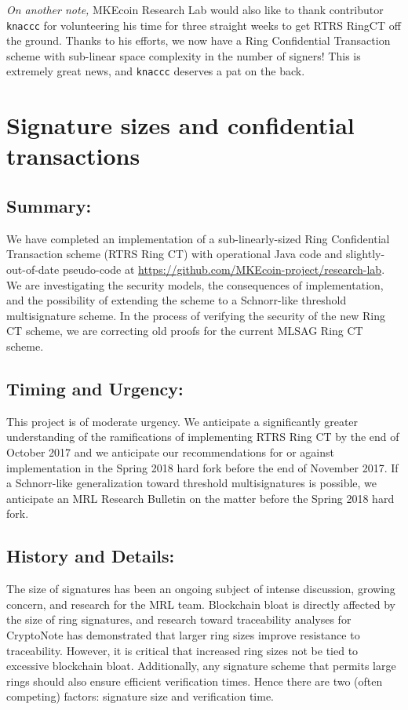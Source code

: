 \documentclass[12pt,english]{mrl}
\theoremstyle{definition}
\numberwithin{equation}{section}
\numberwithin{figure}{section}
\numberwithin{equation}{section}
\numberwithin{equation}{section}
\numberwithin{figure}{section}
\begin{document}
\textit{On another note,} MKEcoin Research Lab would also like to thank contributor \texttt{knaccc} for volunteering his time for three straight weeks to get RTRS RingCT off the ground. Thanks to his efforts, we now have a Ring Confidential Transaction scheme with sub-linear space complexity in the number of signers! This is extremely great news, and \texttt{knaccc} deserves a pat on the back.


\vspace{0.1in}

\section{Signature sizes and confidential transactions} \label{secOne}

\subsection{Summary:} 

We have completed an implementation of a sub-linearly-sized Ring Confidential Transaction scheme (RTRS Ring CT) with operational Java code and slightly-out-of-date pseudo-code at \url{https://github.com/MKEcoin-project/research-lab}. We are investigating the security models, the consequences of implementation, and the possibility of extending the scheme to a Schnorr-like threshold multisignature scheme. In the process of verifying the security of the new Ring CT scheme, we are correcting old proofs for the current MLSAG Ring CT scheme.

\subsection{Timing and Urgency:} 

This project is of moderate urgency. We anticipate a significantly greater understanding of the ramifications of implementing RTRS Ring CT by the end of October 2017 and we anticipate our recommendations for or against implementation in the Spring 2018 hard fork before the end of November 2017. If a Schnorr-like generalization toward threshold multisignatures is possible, we anticipate an MRL Research Bulletin on the matter before the Spring 2018 hard fork.

\subsection{History and Details:} 

The size of signatures has been an ongoing subject of intense discussion, growing concern, and research for the MRL team. Blockchain bloat is directly affected by the size of ring signatures, and research toward traceability analyses for CryptoNote has demonstrated that larger ring sizes improve resistance to traceability. However, it is critical that increased ring sizes not be tied to excessive blockchain bloat. Additionally, any signature scheme that permits large rings should also ensure efficient verification times. Hence there are two (often competing) factors: signature size and verification time.
\end{document}
